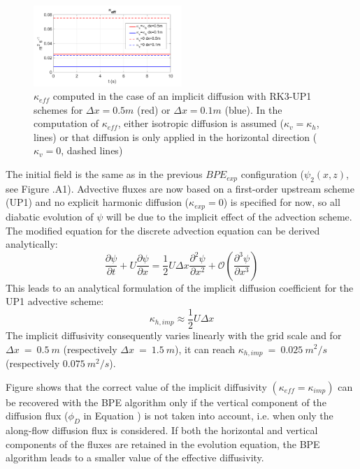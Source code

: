\begin{figure}[h!]
\centering
\includegraphics[width=0.5\textwidth]{./CHAP_BPE/AGBPE_numlab3.png}
\caption[Evaluation of $\kappa_{eff}$ for configuration $BPE_{imp}$ with RK3-UP1 schemes]{$\kappa_{eff}$ computed in the case of an implicit diffusion with RK3-UP1 schemes for $\Delta x=0.5m$ (red) or $\Delta x=0.1m$ (blue). In the computation of $\kappa_{eff}$, either isotropic diffusion is assumed ($\kappa_v=\kappa_h$, lines) or that diffusion is only applied in the horizontal direction ($\kappa_v=0$, dashed lines)}
\label{fig3numlab}
\end{figure}
The initial field is the same as in the previous $BPE_{exp}$ configuration ($\psi_2(x,z)$, see Figure .A1). Advective fluxes are now based on a first-order upstream scheme (UP1) and no explicit harmonic diffusion ($\kappa_{exp}=0$) is specified for now, so all diabatic evolution of $\psi$ will be due to the implicit effect of the advection scheme.
The modified equation for the discrete advection equation can be derived analytically:
\begin{equation}
\frac{\partial \psi}{\partial t}+U \frac{\partial \psi}{\partial x} = \frac{1}{2} U \Delta x  \frac{\partial^2 \psi}{\partial x^2} + \mathcal{O}(\frac{\partial^3 \psi}{\partial x^3})
\end{equation}
This leads to an analytical formulation of the implicit diffusion coefficient for the UP1 advective scheme: 
\begin{equation}
    \displaystyle
    \kappa_{h,imp}\approx\frac{1}{2}U \Delta x
\end{equation}
The implicit diffusivity consequently varies linearly with the grid scale and for $\Delta x\ =\ 0.5\ m$ (respectively $\Delta x\ =\ 1.5\ m$), it can reach $\kappa_{h,imp}\ =\ 0.025\ m^2/s$  (respectively $0.075\ m^2/s$).

Figure  shows that the correct value of the implicit diffusivity $(\kappa_{eff}=\kappa_{imp})$ can be recovered with the BPE algorithm only if the vertical component of the diffusion flux ($\phi_D$ in Equation ) is not taken into account, i.e. when only the along-flow diffusion flux is considered. If both the horizontal and vertical components of the fluxes are retained in the evolution equation, the BPE algorithm leads to a smaller value of the effective diffusivity.

